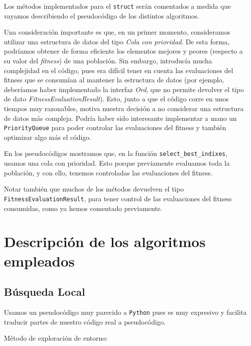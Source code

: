 \documentclass[11pt]{article}
\begin{document}
Los métodos implementados para el \lstinline{struct} serán comentados a medida que vayamos describiendo el pseudocódigo de los distintos algoritmos.

Una consideración importante es que, en un primer momento, consideramos utilizar una estructura de datos del tipo \emph{Cola con prioridad}. De esta forma, podríamos obtener de forma eficiente los elementos mejores y peores (respecto a su valor del \emph{fitness}) de una población. Sin embargo, introducía mucha complejidad en el código, pues era difícil tener en cuenta las evaluaciones del fitness que se consumían al mantener la estructura de datos (por ejemplo, deberíamos haber implementado la interfaz \emph{Ord}, que no permite devolver el tipo de dato \emph{FitnessEvaluationResult}). Esto, junto a que el código corre en unos tiempos muy razonables, motiva nuestra decisión a no considerar una estructura de datos más compleja. Podría haber sido interesante implementar a mano un \lstinline{PriorityQueue} para poder controlar las evaluaciones del fitness y también optimizar algo más el código.

En los pseudocódigos mostramos que, en la función \lstinline{select_best_indixes}, usamos una cola con prioridad. Esto porque previamente evaluamos toda la población, y con ello, tenemos controladas las evaluaciones del fitness.

Notar también que muchos de los métodos devuelven el tipo \lstinline{FitnessEvaluationResult}, para tener control de las evaluaciones del fitness consumidas, como ya hemos comentado previamente.

\pagebreak

\section{Descripción de los algoritmos empleados}

\subsection{Búsqueda Local} \label{pseudocodigo_localsearch}

Usamos un pseudocódigo muy parecido a \lstinline{Python} pues es muy expresivo y facilita traducir partes de nuestro código real a pseudocódigo.

Método de exploración de entorno:
\end{document}
